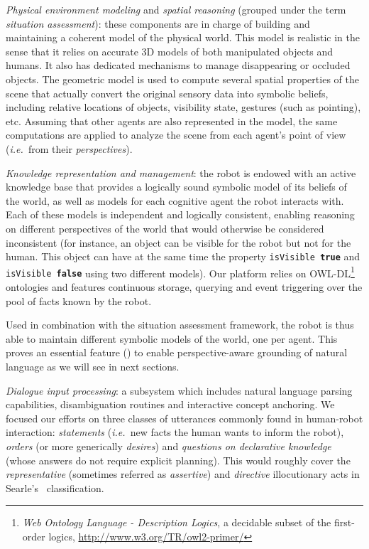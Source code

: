 \documentclass[twocolumn]{svjour3}
\newcommand{\concept}[1]{{\footnotesize \texttt{#1}}}
\newcommand{\ie}{{\textit{i.e.~}}}
\begin{document}
\begin{inparaenum}[\itshape 1)]

\item \emph{Physical environment modeling} and \emph{spatial reasoning}
(grouped under the term \emph{situation assessment}): these components are in
charge of building and maintaining a coherent model of the physical world. This
model is realistic in the sense that it relies on accurate 3D models of both
manipulated objects and humans. It also has dedicated mechanisms to manage
disappearing or occluded objects.  The geometric model is used to compute
several spatial properties of the scene that actually convert the original
sensory data into symbolic beliefs, including relative locations of objects,
visibility state, gestures (such as pointing), etc.  Assuming that other agents
are also represented in the model, the same computations are applied to analyze
the scene from each agent's point of view (\ie from their \emph{perspectives}).

\item \emph{Knowledge representation and management}: the robot is endowed with
an active knowledge base that provides a logically sound symbolic model of its
beliefs of the world, as well as models for each cognitive agent the robot
interacts with. Each of these models is independent and logically consistent,
enabling reasoning on different perspectives of the world that would otherwise
be considered inconsistent (for instance, an object can be visible for the
robot but not for the human. This object can have at the same time the property
\concept{isVisible \textbf{true}} and \concept{isVisible \textbf{false}} using
two different models).  Our platform relies on OWL-DL\footnote{\emph{Web
Ontology Language - Description Logics}, a decidable subset of the first-order
logics, \url{http://www.w3.org/TR/owl2-primer/}} ontologies and features
continuous storage, querying and event triggering over the pool of facts known
by the robot.

Used in combination with the situation assessment framework, the robot is thus
able to maintain different symbolic models of the world, one per agent. This
proves an essential feature (\cite{Roy2005,Kruijff2010}) to enable
perspective-aware grounding of natural language as we will see in next
sections.


\item \emph{Dialogue input processing}: a subsystem which includes natural
language parsing capabilities, disambiguation routines and interactive concept
anchoring. We focused our efforts on three classes of utterances commonly found
in human-robot interaction: \emph{statements} (\ie new facts the human wants to
inform the robot), \emph{orders} (or more generically \emph{desires}) and
\emph{questions on declarative knowledge} (whose answers do not require
explicit planning). This would roughly cover the \emph{representative}
(sometimes referred as \emph{assertive}) and \emph{directive} illocutionary
acts in Searle's~\cite{Searle1976} classification.

\end{inparaenum}
\end{document}
